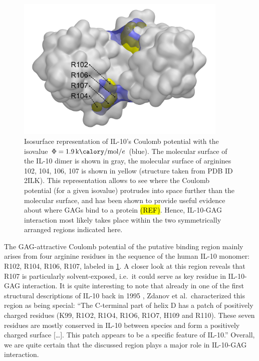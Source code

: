 \begin{figure}
\centering
\includegraphics[width=0.9\textwidth]{gfx/bspred/SI_figure_IL-10_coulomb_isosurface_1_9kcalmol.png}
\caption[]{
Isosurface representation of IL-10's Coulomb potential with the isovalue $\Phi =
\SI{1.9}{\kilo\calory\per\mole\per\elementarycharge}$ (blue). The molecular
surface of the IL-10 dimer is shown in gray, the molecular surface of arginines
102, 104, 106, 107 is shown in yellow (structure taken from PDB ID 2ILK). This
representation allows to see where the Coulomb potential (for a given isovalue)
protrudes into space further than the molecular surface, and has been shown to
provide useful evidence about where GAGs bind to a protein \hl{(REF)}. Hence,
IL-10-GAG interaction most likely takes place within the two symmetrically
arranged regions indicated here.
}
\label{fig:bspred:il10_estatic_pred}
\end{figure}

The GAG-attractive Coulomb potential of the putative binding region mainly
arises from four arginine residues in the sequence of the human IL-10 monomer:
R102, R104, R106, R107, labeled in \cref{fig:bspred:il10_estatic_pred}. A closer
look at this region reveals that R107 is particularly solvent-exposed, i.e.\ it
could serve as key residue in IL-10-GAG interaction. It is quite interesting to
note that already in one of the first structural descriptions of IL-10 back in
1995 \cite{Zdanov1995}, Zdanov et al.\ characterized this region as being
special: \enquote{The C-terminal part of helix D has a patch of positively
charged residues (K99, R1O2, R1O4, R1O6, R1O7, H109 and R110). These seven
residues are mostly conserved in IL-10 between species and form a positively
charged surface [\dots]. This patch appears to be a specific feature of IL-10.}
Overall, we are quite certain that the discussed region plays a major role in
IL-10-GAG interaction.


